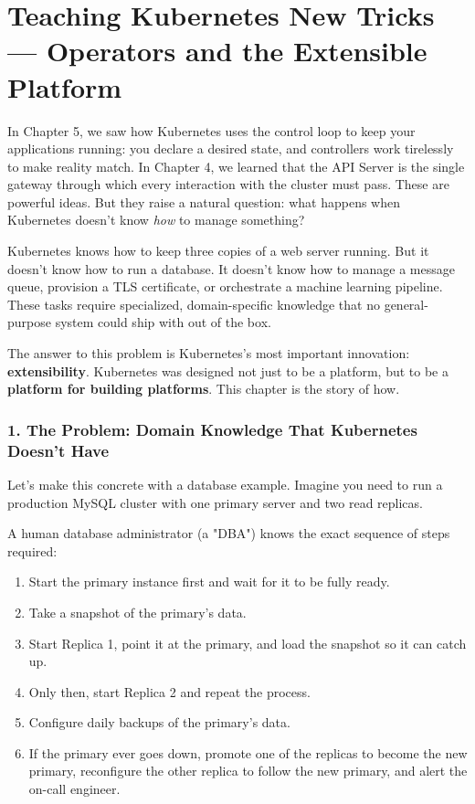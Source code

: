 \chapter{Teaching Kubernetes New Tricks --- Operators and the Extensible Platform}


In Chapter 5, we saw how Kubernetes uses the control loop to keep your applications running: you declare a desired state, and controllers work tirelessly to make reality match. In Chapter 4, we learned that the API Server is the single gateway through which every interaction with the cluster must pass. These are powerful ideas. But they raise a natural question: what happens when Kubernetes doesn't know \textit{how} to manage something?

Kubernetes knows how to keep three copies of a web server running. But it doesn't know how to run a database. It doesn't know how to manage a message queue, provision a TLS certificate, or orchestrate a machine learning pipeline. These tasks require specialized, domain-specific knowledge that no general-purpose system could ship with out of the box.

The answer to this problem is Kubernetes's most important innovation: \textbf{extensibility}. Kubernetes was designed not just to be a platform, but to be a \textbf{platform for building platforms}. This chapter is the story of how.


\subsection{1. The Problem: Domain Knowledge That Kubernetes Doesn't Have}


Let's make this concrete with a database example. Imagine you need to run a production MySQL cluster with one primary server and two read replicas.

A human database administrator (a "DBA") knows the exact sequence of steps required:
\begin{enumerate}
\item Start the primary instance first and wait for it to be fully ready.
\item Take a snapshot of the primary's data.
\item Start Replica 1, point it at the primary, and load the snapshot so it can catch up.
\item Only then, start Replica 2 and repeat the process.
\item Configure daily backups of the primary's data.
\item If the primary ever goes down, promote one of the replicas to become the new primary, reconfigure the other replica to follow the new primary, and alert the on-call engineer.
\end{enumerate}

